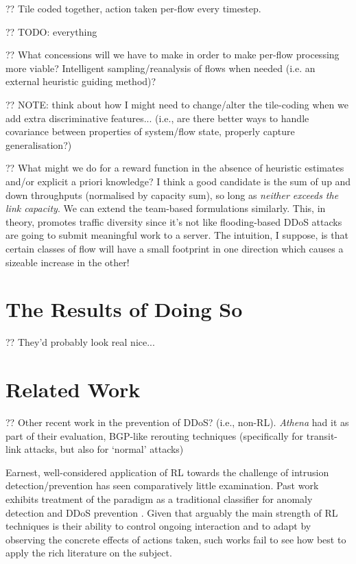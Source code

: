 \documentclass[conference, letterpaper, 10pt, times]{IEEEtran}
\begin{document}
?? Tile coded together, action taken per-flow every timestep.

?? TODO: everything

?? What concessions will we have to make in order to make per-flow processing more viable? Intelligent sampling/reanalysis of flows when needed (i.e. an external heuristic guiding method)?

?? NOTE: think about how I might need to change/alter the tile-coding when we add extra discriminative features... (i.e., are there better ways to handle covariance between properties of system/flow state, properly capture generalisation?)

?? What might we do for a reward function in the absence of heuristic estimates and/or explicit a priori knowledge? I think a good candidate is the sum of up and down throughputs (normalised by capacity sum), so long as \emph{neither exceeds the link capacity}. We can extend the team-based formulations similarly. This, in theory, promotes traffic diversity since it's not like flooding-based DDoS attacks are going to submit meaningful work to a server. The intuition, I suppose, is that certain classes of flow will have a small footprint in one direction which causes a sizeable increase in the other!

\section{The Results of Doing So}\label{sec:the-results-of-doing-so}

?? They'd probably look real nice...

\section{Related Work}

?? Other recent work in the prevention of DDoS? (i.e., non-RL).
\emph{Athena} \cite{DBLP:conf/dsn/LeeKSPY17} had it as part of their evaluation, BGP-like rerouting techniques (specifically for transit-link attacks, but also for `normal' attacks) \cite{RoutingAroundCongestion}

Earnest, well-considered application of RL towards the challenge of intrusion detection/prevention has seen comparatively little examination.
Past work exhibits treatment of the paradigm as a traditional classifier for anomaly detection \cite{shamshirband2014anomaly} and DDoS prevention \cite{DBLP:conf/mates/ServinK08}.
Given that arguably the main strength of RL techniques is their ability to control ongoing interaction and to adapt by observing the concrete effects of actions taken, such works fail to see how best to apply the rich literature on the subject.
\end{document}
